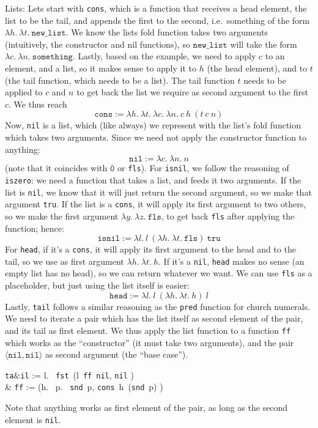 \documentclass{article}
\theoremstyle{definition}
\newcommand{\fls}{\texttt{fls}\xspace}
\newcommand{\tru}{\texttt{tru}\xspace}
\newcommand{\fst}{\texttt{fst}}
\newcommand{\snd}{\texttt{snd}}
\newcommand{\iszero}{\texttt{iszero}\xspace}
\renewcommand{\l}[1]{\lambda #1.~}
\newcommand{\pair}[1]{\langle #1 \rangle}
\newcommand{\num}[1]{\overline{\texttt{#1}}}
\begin{document}
\newpage
Lists:
Lets start with \texttt{cons}, which is a function that receives a head
element, the list to be the tail, and appends the first to the second, i.e.\
something of the form \(\l{h} \l{t} \texttt{new\_list}\). We know the lists
fold function takes two arguments (intuitively, the constructor and nil
functions), so \(\texttt{new\_list}\) will take the form \(\l{c} \l{n}
\texttt{something}\). Lastly, based on the example, we need to apply \(c\)
to an element, and a list, so it makes sense to apply
it to \(h\) (the head element), and to \(t\) (the tail function, which needs
to be a list). The tail function \(t\) needs to be applied to \(c\)
and \(n\) to get back the list we require as second argument to the first
\(c\). We thus reach
\[
  \mathtt{cons} := \l{h} \l{t} \l{c} \l{n} c~h~(t~c~n)
\]
Now, \texttt{nil} is a list, which (like always) we represent
with the list's fold function which takes two arguments. Since we need not
apply the constructor function to anything:
\[
  \texttt{nil} := \l{c} \l{n} n
\]
(note that it coincides with \(\num{0}\) or \fls).
For \texttt{isnil}, we follow the reasoning of \iszero: we need a function
that takes a list, and feeds it two arguments. If the list is \texttt{nil},
we know that it will just return the second argument, so we make that
argument \tru. If the list is a \texttt{cons}, it will apply its first
argument to two others, so we make the first argument \(\l{y} \l{z} \fls\),
to get back \fls after applying the function; hence:
\[
  \texttt{isnil} := \l{l} l~(\l{h} \l{t} \fls)~\tru
\]
For \texttt{head}, if it's a \texttt{cons}, it will apply its first argument
to the head and to the tail, so we use as first argument \(\l{h} \l{t} h\).
If it's a \texttt{nil}, \texttt{head} makes no sense (an empty list has no
head), so we can return whatever we want. We can use \fls as a placeholder,
but just using the list itself is easier:
\[
  \texttt{head} := \l{l} l~(\l{h} \l{t} h)~l
\]
Lastly, \texttt{tail} follows a similar reasoning as the \texttt{pred}
function for church numerals. We need to iterate a pair which has the list
itself as second element of the pair, and its tail as first element. We thus
apply the list function to a function \texttt{ff} which works as the
``constructor'' (it must take two arguments), and the pair
\(\pair{\texttt{nil}, \texttt{nil}}\) as second argument (the ``base case'').
\begin{flalign*}
  \texttt{ta}&\texttt{il} := \l{l} \fst~(l~\texttt{ff}~\pair{\texttt{nil}, \texttt{nil}}) \\
           &\text{where } \texttt{ff} := (\l{h} \l{p} \pair{\snd~p, \texttt{cons}~h~(\snd~p)})
\end{flalign*}
Note that anything works as first element of the pair, as long as the second
element is \texttt{nil}.
\end{document}
